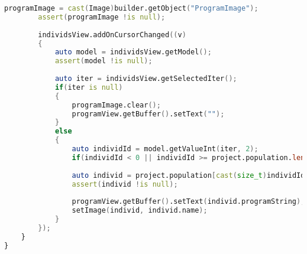 \documentclass[russian,utf8,emptystyle]{eskdtext}
\begin{document}
\begin{lstlisting}[language=D]
        programImage = cast(Image)builder.getObject("ProgramImage");
        assert(programImage !is null);
        
        individsView.addOnCursorChanged((v)
        {
            auto model = individsView.getModel();
            assert(model !is null);
            
            auto iter = individsView.getSelectedIter();
            if(iter is null)
            {
                programImage.clear();
                programView.getBuffer().setText("");
            }
            else
            {
                auto individId = model.getValueInt(iter, 2);
                if(individId < 0 || individId >= project.population.length) return;
                
                auto individ = project.population[cast(size_t)individId];
                assert(individ !is null);
                
                programView.getBuffer().setText(individ.programString);
                setImage(individ, individ.name);
            }
        });
    }
}
\end{lstlisting}
\end{document}
